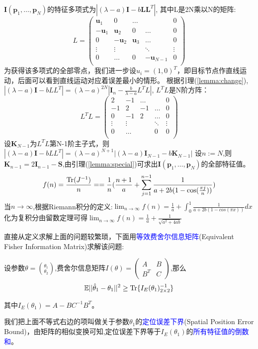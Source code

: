 $\bm{I}(\bm{p}_1,\dots,\bm{p}_N)$的特征多项式为$|(\lambda-a)\bm{I}-b\bm{L}\bm{L}^T|$,
其中L是2N乘以N的矩阵:
\[
L=\left(
\begin{array}{ccccc}
\bm{u}_1&0&\dots&&0\\
-\bm{u}_1&\bm{u}_2&0&\dots&0\\
0&-\bm{u}_2&\bm{u}_3&\dots&0\\
\vdots &\vdots&&\ddots &\vdots\\
0&\dots&0&-\bm{u}_{N-1}&0\\
\end{array}
\right)
\]
为获得该多项式的全部零点，我们进一步设$u_i=(1,0)^T$，即目标节点作直线运动，后面可以看到直线运动对应着误差最小的情形。
根据引理(\ref{lemma:change}),$|(\lambda-a)\bm{I}-bLL^T|=(\lambda-a)^{2N}|\bm{I}_n-\frac{b}{\lambda-a}L^TL|$,
$L^TL$是N阶方阵：
\[
L^TL=\left(
\begin{array}{ccccc}
2&-1&\dots&&0\\
-1&2&-1&\dots&0\\
0&-1&2&\dots&0\\
\vdots &\vdots&&\ddots &\vdots\\
0&\dots&&0&0\\
\end{array}
\right)
\]
设$\bm{K}_{N-1}$为$L^TL$第N-1阶主子式，则
$|(\lambda-a)\bm{I}-bLL^T|=(\lambda-a)^{N+1}|(\lambda-a)\bm{I}_{N-1}-b\bm{K}_{N-1}|$
设$n:=N$,则$\bm{K}_{n-1}=2\bm{I}_{n-1}-\bm{S}$,由引理(\ref{lemma:special})可求出$\bm{I}(\bm{p}_1,\dots,\bm{p}_N)$的全部特征值。
\[
f(n)=\frac{\operatorname{Tr}(J^{-1})}{n}==\frac{1}{n}(\frac{n+1}{a}+\sum_{j=1}^{n-1}\frac{1}{a+2b(1-\cos(\frac{\pi j}{n}))})
\]
当$n\to \infty$,根据Riemann积分的定义:$\lim_{n\rightarrow \infty}f(n)=\frac{1}{a}+\int_0^1 \frac{1}{a+2b(1-cos(\pi x))}dx$
化为复积分由留数定理可得$\lim_{n\rightarrow \infty}f(n)=\frac{1}{a}+\frac{1}{\sqrt{a^2+4ab}}$

直接从定义求解上面的问题较繁琐，下面用\textcolor{blue}{等效费舍尔信息矩阵}(Equivalent Fisher Information Matrix)求解该问题:
\begin{theorem}
    设参数$\theta=\binom{\theta_1}{\theta_2}$,费舍尔信息矩阵$I(\theta)=\left(\begin{array}{cc}A&B\\B^T&C\end{array}\right)$,那么\[
    \mathbb{E}{||\hat{\theta}_1-\theta_1||^2}\geq \operatorname{Tr}\{I_E(\theta_1)^{-1}_{2\times 2}\}\]

    其中$I_E(\theta_1)=A-BC^{-1}B^T$。
\end{theorem}
	我们把上面不等式右边的项叫做关于参数$\theta_1$的\textcolor{blue}{定位误差下界}(Spatial Position Error Bound)，由矩阵的相似变换可知,定位误差下界等于$I_E(\theta_1)$的\textcolor{blue}{所有特征值的倒数和}。

